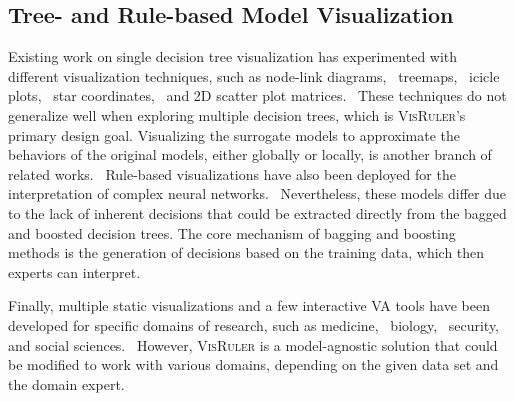 \subsection{Tree- and Rule-based Model Visualization}
Existing work on single decision tree visualization has experimented with different visualization techniques, such as node-link diagrams,~\cite{Elzen2011BaobabView,Nguyen2000A,Lee2016An,Cavallo2019Clustrophile,Barlow2001Case,Phillips2017FFTrees,Bremm2011Interactive,Hongzhi2004Multiple,Munzner2003TreeJuxtaposer,Behrisch2014Feedback} treemaps,~\cite{Muhlbacher2018TreePOD,Gomez2013Visualizing} icicle plots,~\cite{Padua2014Interactive,Ankerst2000Towards} star coordinates,~\cite{Teoh2003Starclass,Teoh2003PaintingClass} and 2D scatter plot matrices.~\cite{Do2007Towards} These techniques do not generalize well when exploring multiple decision trees, which is \textsc{VisRuler}'s primary design goal. Visualizing the surrogate models to approximate the behaviors of the original models, either globally or locally, is another branch of related works.~\cite{Yuan2022Visual,Cao2020DRIL,Castro2019Surrogate,Han2000RuleViz,Agus2021RISSAD,Ware2001Interactive,Yuan2021An,Eisemann2014A} Rule-based visualizations have also been deployed for the interpretation of complex neural networks.~\cite{Marcilio2021ExplorerTree,Ming2019RuleMatrix,Jia2020Visualizing,ThomasFacetRules} Nevertheless, these models differ due to the lack of inherent decisions that could be extracted directly from the bagged and boosted decision trees. The core mechanism of bagging and boosting methods is the generation of decisions based on the training data, which then experts can interpret.

Finally, multiple static visualizations and a few interactive VA tools have been developed for specific domains of research, such as medicine,~\cite{Hummelen2010Deep,Viros2008Improving,Li2020A,Niemman2014Learning,Carlson2008Phylogenetic} biology,~\cite{Abramov2019RuleVis,Sydow2014Structure} security,~\cite{Aupetit2016Visualization} and social sciences.~\cite{Moussaid2013Social} However, \textsc{VisRuler} is a model-agnostic solution that could be modified to work with various domains, depending on the given data set and the domain expert. 
%
%

